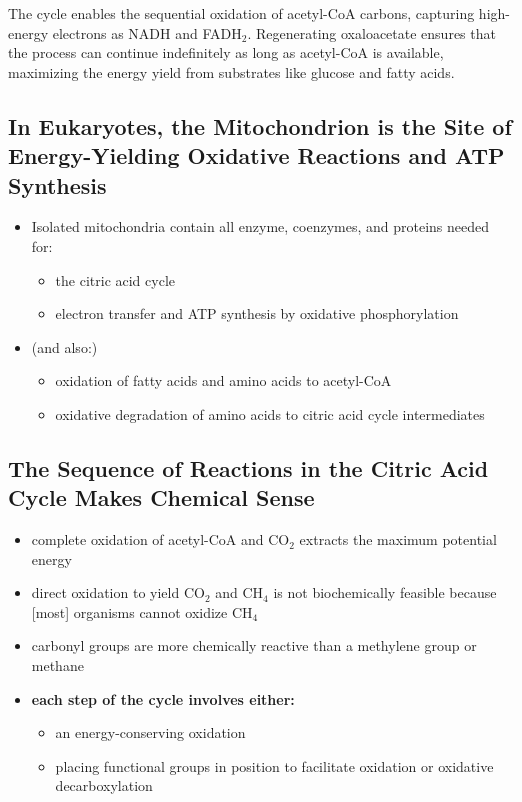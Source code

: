\documentclass[10pt]{article}
\begin{document}
The cycle enables the sequential oxidation of acetyl-CoA carbons, capturing high-energy electrons as NADH and FADH$_2$.  Regenerating oxaloacetate ensures that the process can continue indefinitely as long as acetyl-CoA is available, maximizing the energy yield from substrates like glucose and fatty acids.

\subsection*{In Eukaryotes, the Mitochondrion is the Site of Energy-Yielding Oxidative Reactions and ATP Synthesis}
\begin{itemize}
	\item Isolated mitochondria contain all enzyme, coenzymes, and proteins needed for:
	\begin{itemize}
        \item the citric acid cycle
        \item electron transfer and ATP synthesis by oxidative phosphorylation
    \end{itemize}
    \item (and also:)
    \begin{itemize}
        \item oxidation of fatty acids and amino acids to acetyl-CoA
        \item oxidative degradation of amino acids to citric acid cycle intermediates
    \end{itemize}
\end{itemize}

\subsection*{The Sequence of Reactions in the Citric Acid Cycle Makes Chemical Sense}
\begin{itemize}
	\item complete oxidation of acetyl-CoA and CO$_2$ extracts the maximum potential energy
	\item direct oxidation to yield CO$_2$ and CH$_4$ is not biochemically feasible because [most] organisms cannot oxidize CH$_4$
	\item carbonyl groups are more chemically reactive than a methylene group or methane
	\item \textbf{each step of the cycle involves either:}
	\begin{itemize}
        \item an energy-conserving oxidation
        \item placing functional groups in position to facilitate oxidation or oxidative decarboxylation
    \end{itemize}
\end{itemize}
\end{document}
